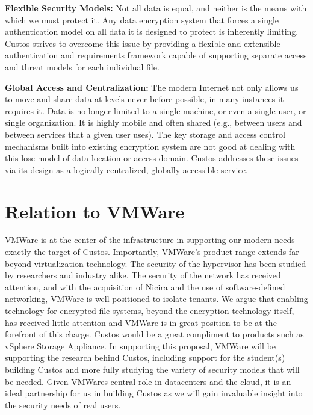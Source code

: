 \noindent
\textbf{Flexible Security Models:}
Not all data is equal, and neither is the means with which we must
protect it. Any data
encryption system that forces a single authentication model on all
data it is designed to protect is inherently limiting.
Custos strives to overcome this issue by providing a flexible and
extensible authentication and requirements framework capable of
supporting separate access and threat models for each individual
file. 

\noindent
\textbf{Global Access and Centralization:}
The modern Internet not only allows us to move and share data at
levels never before possible, in many instances it requires it. Data
is no longer limited to a single machine, or even a single user, or single
organization. It is highly mobile and often shared (e.g., between users and between
services that a given user uses). The key storage and access control mechanisms
built into existing encryption system are not good at dealing with
this lose model of data location or access domain.
Custos addresses these issues via its design as a logically
centralized, globally accessible service.



\section{Relation to VMWare}

VMWare is at the center of the infrastructure in supporting our
modern needs -- exactly the target of Custos.  Importantly,
VMWare's product range extends far beyond virtualization technology.
The security of the hypervisor has been studied by researchers and 
industry alike.  The security of the
network has received attention, and with the acquisition of Nicira and 
the use of software-defined networking, VMWare is well positioned to
isolate tenants.  We argue that enabling technology for encrypted file systems,
beyond the encryption technology itself, has received little attention and
VMWare is in great position to be at the forefront of this charge.
Custos would be a great compliment to products such as vSphere Storage 
Appliance.  In supporting this proposal, VMWare will be supporting 
the research behind Custos, including support for the student(s) building 
Custos and more fully studying the variety of security models that will be
needed.  Given VMWares central role in datacenters and the cloud, 
it is an ideal partnership for us in building Custos as we will gain invaluable 
insight into the security needs of real users.
